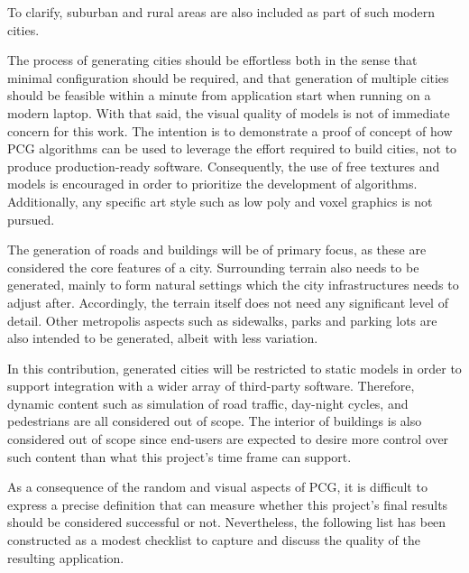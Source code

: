 To clarify, suburban and rural areas are also included as part of such modern cities.

The process of generating cities should be effortless both in the sense that minimal configuration should be required, and that generation of multiple cities should be feasible within a minute from application start when running on a modern laptop.
With that said, the visual quality of models is not of immediate concern for this work.
The intention is to demonstrate a proof of concept of how PCG algorithms can be used to leverage the effort required to build cities, not to produce production-ready software.
Consequently, the use of free textures and models is encouraged in order to prioritize the development of algorithms.
Additionally, any specific art style such as low poly \cite{lowpoly_wiki} and voxel graphics \cite{voxels_wiki} is not pursued.

The generation of roads and buildings will be of primary focus, as these are considered the core features of a city.
Surrounding terrain also needs to be generated, mainly to form natural settings which the city infrastructures needs to adjust after.
Accordingly, the terrain itself does not need any significant level of detail.
Other metropolis aspects such as sidewalks, parks and parking lots are also intended to be generated, albeit with less variation.

In this contribution, generated cities will be restricted to static models in order to support integration with a wider array of third-party software.
Therefore, dynamic content such as simulation of road traffic, day-night cycles, and pedestrians are all considered out of scope.
The interior of buildings is also considered out of scope since end-users are expected to desire more control over such content than what this project's time frame can support.

As a consequence of the random and visual aspects of PCG, it is difficult to express a precise definition that can measure whether this project's final results should be considered successful or not.
Nevertheless, the following list has been constructed as a modest checklist to capture and discuss the quality of the resulting application.

